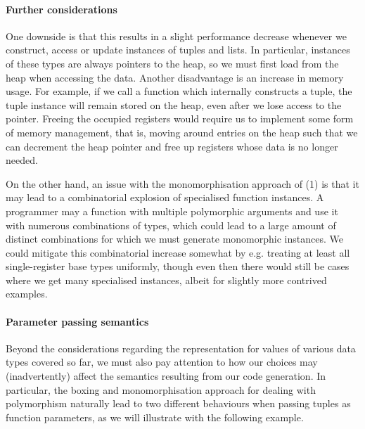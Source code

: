 \paragraph{Further considerations}
One downside is that this results in a slight performance decrease whenever we
construct, access or update instances of tuples and lists. In particular,
instances of these types are always pointers to the heap, so we must first load
from the heap when accessing the data.
Another disadvantage is an increase in memory usage. For example, if we call
a function which internally constructs a tuple, the tuple instance will remain
stored on the heap, even after we lose access to the pointer.
Freeing the occupied registers would require us to implement some form of memory
management, that is, moving around entries on the heap such that we can
decrement the heap pointer and free up registers whose data is no longer needed.

On the other hand, an issue with the monomorphisation approach of (1) is that it
may lead to a combinatorial explosion of specialised function instances.
%
A programmer may a function with multiple polymorphic arguments and use it with
numerous combinations of types, which could lead to a large amount of distinct
combinations for which we must generate monomorphic instances.
We could mitigate this combinatorial increase somewhat by e.g. treating at least
all single-register base types uniformly, though even then there would still be
cases where we get many specialised instances, albeit for slightly more
contrived examples.

\paragraph{Parameter passing semantics}
Beyond the considerations regarding the representation for values of various
data types covered so far, we must also pay attention to how our choices may
(inadvertently) affect the semantics resulting from our code generation.
In particular, the boxing and monomorphisation approach for dealing with
polymorphism naturally lead to two different behaviours when passing tuples as
function parameters, as we will illustrate with the following example.

